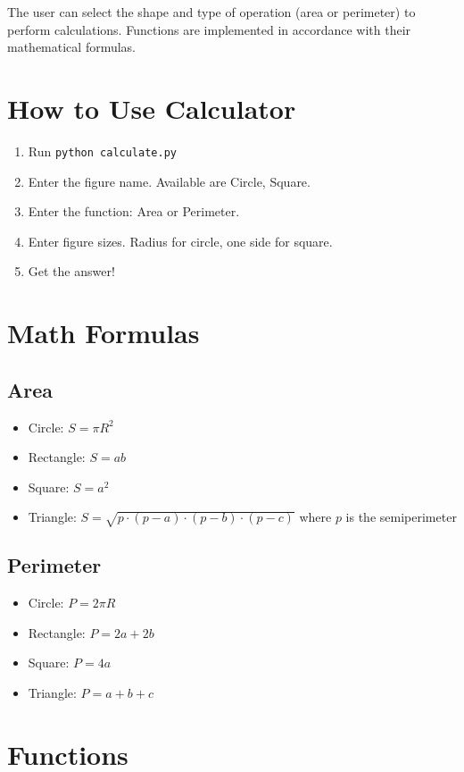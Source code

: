\documentclass{article}
\begin{document}
The user can select the shape and type of operation (area or perimeter) to perform calculations. Functions are implemented in accordance with their mathematical formulas.

\section*{How to Use Calculator}

\begin{enumerate}
\item Run \texttt{python calculate.py}
\item Enter the figure name. Available are Circle, Square.
\item Enter the function: Area or Perimeter.
\item Enter figure sizes. Radius for circle, one side for square.
\item Get the answer!
\end{enumerate}

\section*{Math Formulas}

\subsection*{Area}
\begin{itemize}
\item Circle: \( S = \pi R^2 \)
\item Rectangle: \( S = ab \)
\item Square: \( S = a^2 \)
\item Triangle: \( S = \sqrt{p \cdot (p-a) \cdot (p-b) \cdot (p-c)} \) where \( p \) is the semiperimeter
\end{itemize}

\subsection*{Perimeter}
\begin{itemize}
\item Circle: \( P = 2\pi R \)
\item Rectangle: \( P = 2a + 2b \)
\item Square: \( P = 4a \)
\item Triangle: \( P = a + b + c \)
\end{itemize}

\section*{Functions}
\end{document}
